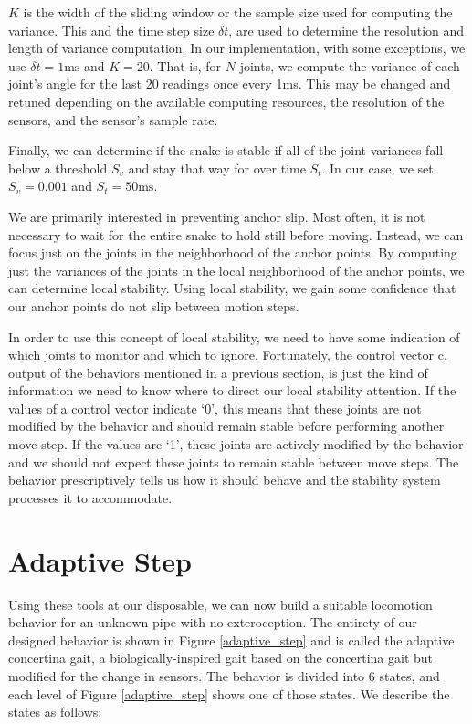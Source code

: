 $K$ is the width of the sliding window or the sample size used for computing the variance.  This and the time step size $\delta t$, are used to determine the resolution and length of variance computation.  In our implementation, with some exceptions, we use $\delta t = 1\mathrm{ms}$ and $K = 20$.  That is, for $N$ joints, we compute the variance of each joint’s angle for the last 20 readings once every 1ms.  This may be changed and retuned depending on the available computing resources, the resolution of the sensors, and the sensor’s sample rate.

Finally, we can determine if the snake is stable if all of the joint variances fall below a threshold $S_v$ and stay that way for over time $S_t$.  In our case, we set $S_v = 0.001$ and $S_t = 50\mathrm{ms}$.

We are primarily interested in preventing anchor slip.  Most often, it is not necessary to wait for the entire snake to hold still before moving.  Instead, we can focus just on the joints in the neighborhood of the anchor points.  By computing just the variances of the joints in the local neighborhood of the anchor points, we can determine local stability.  Using local stability, we gain some confidence that our anchor points do not slip between motion steps.

In order to use this concept of local stability, we need to have some indication of which joints to monitor and which to ignore.  Fortunately, the control vector c, output of the behaviors mentioned in a previous section, is just the kind of information we need to know where to direct our local stability attention.  If the values of a control vector indicate ‘0’, this means that these joints are not modified by the behavior and should remain stable before performing another move step.  If the values are ‘1’, these joints are actively modified by the behavior and we should not expect these joints to remain stable between move steps.  The behavior prescriptively tells us how it should behave and the stability system processes it to accommodate.

\section{Adaptive Step}



Using these tools at our disposable, we can now build a suitable locomotion behavior for an unknown pipe with no exteroception.  The entirety of our designed behavior is shown in Figure \ref{adaptive_step} and is called the adaptive concertina gait, a biologically-inspired gait based on the concertina gait but modified for the change in sensors.  The behavior is divided into 6 states, and each level of Figure \ref{adaptive_step} shows one of those states.  We describe the states as follows:


